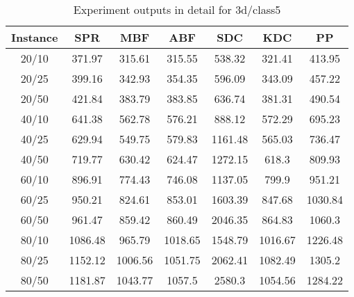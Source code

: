 \begin{table}[ht!]
    \caption{Experiment outputs in detail for 3d/class5}
    \centering
    \begin{tabular}{@{}ccccccc@{}}
        \toprule
        {\bfseries Instance} & {\bfseries SPR} & {\bfseries MBF}
        & {\bfseries ABF} & {\bfseries SDC} & {\bfseries KDC} & {\bfseries PP}\\
        \midrule
        20/10 & 371.97 & 315.61 & 315.55 & 538.32 & 321.41 & 413.95\\
        20/25 & 399.16 & 342.93 & 354.35 & 596.09 & 343.09 & 457.22\\
        20/50 & 421.84 & 383.79 & 383.85 & 636.74 & 381.31 & 490.54\\
        40/10 & 641.38 & 562.78 & 576.21 & 888.12 & 572.29 & 695.23\\
        40/25 & 629.94 & 549.75 & 579.83 & 1161.48 & 565.03 & 736.47\\
        40/50 & 719.77 & 630.42 & 624.47 & 1272.15 & 618.3 & 809.93\\
        60/10 & 896.91 & 774.43 & 746.08 & 1137.05 & 799.9 & 951.21\\
        60/25 & 950.21 & 824.61 & 853.01 & 1603.39 & 847.68 & 1030.84\\
        60/50 & 961.47 & 859.42 & 860.49 & 2046.35 & 864.83 & 1060.3\\
        80/10 & 1086.48 & 965.79 & 1018.65 & 1548.79 & 1016.67 & 1226.48\\
        80/25 & 1152.12 & 1006.56 & 1051.75 & 2062.41 & 1082.49 & 1305.2\\
        80/50 & 1181.87 & 1043.77 & 1057.5 & 2580.3 & 1054.56 & 1284.22\\
        \bottomrule
    \end{tabular}
\end{table}